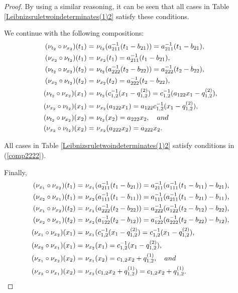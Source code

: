 \documentclass{amsart}
\theoremstyle{definition}
\theoremstyle{remark}
\numberwithin{equation}{section}
\begin{document}
\begin{proof}
By using a similar reasoning, it can be seen that all cases in Table \ref{Leibnizsruletwoindeterminates(1)2} satisfy these conditions.

We continue with the following compositions:
\begin{align}
    (\nu_{t_2} \circ \nu_{x_2})(t_1) = &\ \nu_{t_2}(a_{211}^{-1}(t_1-b_{21}))=a_{211}^{-1}(t_1-b_{21}), \notag \\
    (\nu_{x_2} \circ \nu_{t_2})(t_1) = &\ \nu_{x_2}(t_1) = a_{211}^{-1}(t_1-b_{21}), \notag \\
    (\nu_{t_2} \circ \nu_{x_2})(t_2) = &\ \nu_{t_2}(a_{222}^{-1}(t_2-b_{22}))=a_{222}^{-1}(t_2-b_{22}), \notag \\
    (\nu_{x_2} \circ \nu_{t_2})(t_2) = &\ \nu_{x_2}(t_2) = a_{222}^{-1}(t_2-b_{22}), \notag \\
    (\nu_{t_2} \circ \nu_{x_2})(x_1) = &\ \nu_{t_2}(c_{1,2}^{-1}(x_1-q_{1,2}^{(2)})=c_{1,2}^{-1}(a_{122}x_1-q_{1,2}^{(2)}), \label{comp2222}\\ 
    (\nu_{x_2} \circ \nu_{t_2})(x_1) = &\  \nu_{x_2}(a_{122}x_1)=a_{122}c_{1,2}^{-1}(x_1-q_{1,2}^{(2)}), \notag \\
    (\nu_{t_2} \circ \nu_{x_2})(x_2) = &\ \nu_{t_2}(x_2)=a_{222}x_2, \quad {\rm and} \notag \\  
 (\nu_{x_2} \circ \nu_{t_2})(x_2) = &\ \nu_{x_2}(a_{222}x_2)=a_{222}x_2. \notag
\end{align}

All cases in Table \ref{Leibnizsruletwoindeterminates(1)2} satisfy conditions in (\ref{comp2222}).

Finally, 
\begin{align}
    (\nu_{x_1} \circ \nu_{x_2})(t_1) = &\ \nu_{x_1}(a_{211}^{-1}(t_1-b_{21}))=a_{211}^{-1}(a_{111}^{-1}(t_1-b_{11})-b_{21}), \notag \\
    (\nu_{x_2} \circ \nu_{x_1})(t_1) = &\ \nu_{x_2}(a_{111}^{-1}(t_1-b_{11})) = a_{111}^{-1}(a_{211}^{-1}(t_1-b_{21})-b_{11}), \notag \\
    (\nu_{x_1} \circ \nu_{x_2})(t_2) = &\ \nu_{x_1}(a_{222}^{-1}(t_2-b_{22}))=a_{222}^{-1}(a_{122}^{-1}(t_2-b_{12})-b_{22}), \notag \\
    (\nu_{x_2} \circ \nu_{x_1})(t_2) = &\ \nu_{x_2}(a_{122}^{-1}(t_2-b_{12})) = a_{122}^{-1}(a_{222}^{-1}(t_2-b_{22})-b_{12}), \notag \\
    (\nu_{x_1} \circ \nu_{x_2})(x_1) = &\ \nu_{x_1}(c_{1,2}^{-1}(x_1-q_{1,2}^{(2)})=c_{1,2}^{-1}(x_1-q_{1,2}^{(2)}), \label{comp1221..}\\ 
    (\nu_{x_2} \circ \nu_{x_1})(x_1) = &\  \nu_{x_2}(x_1)=c_{1,2}^{-1}(x_1-q_{1,2}^{(2)}), \notag \\
    (\nu_{x_1} \circ \nu_{x_2})(x_2) = &\ \nu_{x_1}(x_2)=c_{1,2}x_2+q_{1,2}^{(1)}, \quad {\rm and} \notag \\  
 (\nu_{x_2} \circ \nu_{x_1})(x_2) = &\ \nu_{x_2}(c_{1,2}x_2+q_{1,2}^{(1)})=c_{1,2}x_2+q_{1,2}^{(1)}. \notag
\end{align}


\end{proof}
\end{document}
